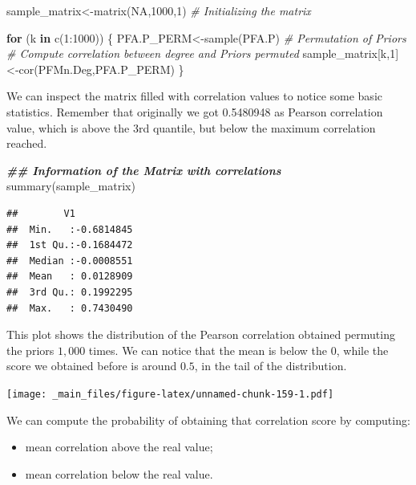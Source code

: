 \documentclass[
  notitlepage,
  onecolumn,
  openany]{book}
\newenvironment{Shaded}{\begin{snugshade}}{\end{snugshade}}
\newcommand{\CommentTok}[1]{\textcolor[rgb]{0.56,0.35,0.01}{\textit{#1}}}
\newcommand{\ConstantTok}[1]{\textcolor[rgb]{0.00,0.00,0.00}{#1}}
\newcommand{\ControlFlowTok}[1]{\textcolor[rgb]{0.13,0.29,0.53}{\textbf{#1}}}
\newcommand{\DecValTok}[1]{\textcolor[rgb]{0.00,0.00,0.81}{#1}}
\newcommand{\DocumentationTok}[1]{\textcolor[rgb]{0.56,0.35,0.01}{\textbf{\textit{#1}}}}
\newcommand{\FunctionTok}[1]{\textcolor[rgb]{0.00,0.00,0.00}{#1}}
\newcommand{\NormalTok}[1]{#1}
\newcommand{\OtherTok}[1]{\textcolor[rgb]{0.56,0.35,0.01}{#1}}
\newcommand{\SpecialCharTok}[1]{\textcolor[rgb]{0.00,0.00,0.00}{#1}}
\providecommand{\tightlist}{%
  \setlength{\itemsep}{0pt}\setlength{\parskip}{0pt}}
\begin{document}
\begin{Shaded}
\begin{Highlighting}[]
\NormalTok{sample\_matrix}\OtherTok{\textless{}{-}}\FunctionTok{matrix}\NormalTok{(}\ConstantTok{NA}\NormalTok{,}\DecValTok{1000}\NormalTok{,}\DecValTok{1}\NormalTok{) }\CommentTok{\# Initializing the matrix}

\ControlFlowTok{for}\NormalTok{ (k }\ControlFlowTok{in} \FunctionTok{c}\NormalTok{(}\DecValTok{1}\SpecialCharTok{:}\DecValTok{1000}\NormalTok{))}
\NormalTok{\{}
\NormalTok{  PFA.P\_PERM}\OtherTok{\textless{}{-}}\FunctionTok{sample}\NormalTok{(PFA.P) }\CommentTok{\# Permutation of Priors}
  \CommentTok{\# Compute correlation between degree and Priors permuted}
\NormalTok{  sample\_matrix[k,}\DecValTok{1}\NormalTok{]}\OtherTok{\textless{}{-}}\FunctionTok{cor}\NormalTok{(PFMn.Deg,PFA.P\_PERM) }
\NormalTok{\}}
\end{Highlighting}
\end{Shaded}

We can inspect the matrix filled with correlation values to notice some basic statistics. Remember that originally we got 0.5480948 as Pearson correlation value, which is above the 3rd quantile, but below the maximum correlation reached.

\begin{Shaded}
\begin{Highlighting}[]
\DocumentationTok{\#\# Information of the Matrix with correlations}
\FunctionTok{summary}\NormalTok{(sample\_matrix)}
\end{Highlighting}
\end{Shaded}

\begin{verbatim}
##        V1            
##  Min.   :-0.6814845  
##  1st Qu.:-0.1684472  
##  Median :-0.0008551  
##  Mean   : 0.0128909  
##  3rd Qu.: 0.1992295  
##  Max.   : 0.7430490
\end{verbatim}

This plot shows the distribution of the Pearson correlation obtained permuting the priors \(1,000\) times. We can notice that the mean is below the \(0\), while the score we obtained before is around \(0.5\), in the tail of the distribution.

\texttt{[image: \_main\_files/figure-latex/unnamed-chunk-159-1.pdf]}

We can compute the probability of obtaining that correlation score by computing:

\begin{itemize}
\tightlist
\item
  mean correlation above the real value;
\item
  mean correlation below the real value.
\end{itemize}
\end{document}
